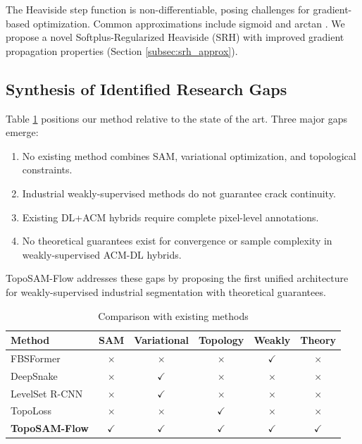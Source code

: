 \documentclass[12pt, a4paper]{article}
\begin{document}
The Heaviside step function is non-differentiable, posing challenges for gradient-based optimization. Common approximations include sigmoid \cite{chan2001active} and arctan \cite{levelset_diff2022}. We propose a novel Softplus-Regularized Heaviside (SRH) with improved gradient propagation properties (Section \ref{subsec:srh_approx}).

\subsection{Synthesis of Identified Research Gaps}
\label{subsec:research_gaps}

Table \ref{tab:comparison_related} positions our method relative to the state of the art. Three major gaps emerge:

\begin{enumerate}
    \item No existing method combines SAM, variational optimization, and topological constraints.
    \item Industrial weakly-supervised methods do not guarantee crack continuity.
    \item Existing DL+ACM hybrids require complete pixel-level annotations.
    \item No theoretical guarantees exist for convergence or sample complexity in weakly-supervised ACM-DL hybrids.
\end{enumerate}

TopoSAM-Flow addresses these gaps by proposing the first unified architecture for weakly-supervised industrial segmentation with theoretical guarantees.

\begin{table}[h]
\centering
\caption{Comparison with existing methods}
\label{tab:comparison_related}
\begin{tabular}{lccccc}
\toprule
\textbf{Method} & \textbf{SAM} & \textbf{Variational} & \textbf{Topology} & \textbf{Weakly} & \textbf{Theory} \\
\midrule
FBSFormer \cite{shi2024fbsformer} & $\times$ & $\times$ & $\times$ & $\checkmark$ & $\times$ \\
DeepSnake \cite{peng2020deepsnake} & $\times$ & $\checkmark$ & $\times$ & $\times$ & $\times$ \\
LevelSet R-CNN \cite{chen2020levelset} & $\times$ & $\checkmark$ & $\times$ & $\times$ & $\times$ \\
TopoLoss \cite{kafer2020topological} & $\times$ & $\times$ & $\checkmark$ & $\times$ & $\times$ \\
\textbf{TopoSAM-Flow} & $\checkmark$ & $\checkmark$ & $\checkmark$ & $\checkmark$ & $\checkmark$ \\
\bottomrule
\end{tabular}
\end{table}
\end{document}
